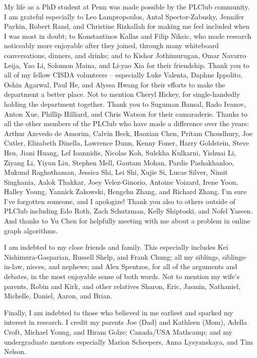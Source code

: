 My life as a PhD student at Penn was made possible by the PLClub community.
I am grateful especially to Leo Lampropoulos, Antal Spector-Zabusky, Jennifer Paykin, Robert Rand, and Christine Rizkallah for making me feel included when I was most in doubt;
to Konstantinos Kallas and Filip Niksic, who made research noticeably more enjoyable after they joined, through many whiteboard conversations, dinners, and drinks;
and to Kishor Jothimurugan, Omar Navarro Leija, Yao Li, Solomon Maina, and Li-yao Xia for their friendship.
Thank you to all of my fellow CISDA volunteers -- especially Luke Valenta, Daphne Ippolito, Oshin Agarwal, Paul He, and Alyssa Hwang for their efforts to make the department a better place.
Not to mention Cheryl Hickey, for single-handedly holding the department together.
Thank you to Suguman Bansal, Rado Ivanov, Anton Xue, Phillip Hilliard, and Chris Watson for their camaraderie.
Thanks to all the other members of the PLClub who have made a difference over the years:
Arthur Azevedo de Amorim,
Calvin Beck,
Haoxian Chen,
Pritam Choudhury,
Joe Cutler,
Elizabeth Dinella,
Lawrence Dunn,
Kenny Foner,
Harry Goldstein,
Steve Hsu,
Jiani Huang,
Lef Ioannidis,
Nicolas Koh,
Sulekha Kulkarni,
Yishuai Li,
Ziyang Li,
Yiyun Liu,
Stephen Mell,
Gautam Mohan,
Pardis Pashakhanloo,
Mukund Raghothaman,
Jessica Shi,
Lei Shi,
Xujie Si,
Lucas Silver,
Nimit Singhania,
Aalok Thakkar,
Joey Velez-Ginorio,
Antoine Voizard,
Irene Yoon,
Halley Young,
Yannick Zakowski,
Hengchu Zhang,
and
Richard Zhang.
I'm sure I've forgotten someone, and I apologize!
Thank you also to others outside of PLClub including Edo Roth, Zach Schutzman, Kelly Shiptoski, and Nofel Yaseen.
And thanks to Yu Chen for helpfully meeting with me about a problem in online graph algorithms.

I am indebted to my close friends and family. This especially includes Kei Nishimura-Gasparian, Russell Shelp, and Frank Chung; all my siblings, siblings-in-law, nieces, and nephews; and Alex Spentzos, for all of the arguments and debates, in the most enjoyable sense of both words.
Not to mention my wife's parents, Robin and Kirk, and other relatives Sharon, Eric, Jasmin, Nathaniel, Michelle, Daniel, Aaron, and Brian.

Finally, I am indebted to those who believed in me earliest and sparked my interest in research.
I credit my parents Joe (Dad) and Kathleen (Mom),
Adella Croft, Michael Young, and Hiram Golze;
Canada/USA Mathcamp;
and my undergraduate mentors especially Marion Scheepers, Anna Lysyanskaya, and Tim Nelson.
